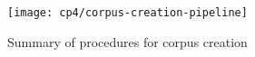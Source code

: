 \begin{figure}
    \centering
    \texttt{[image: cp4/corpus-creation-pipeline]}
    \caption{Summary of procedures for corpus creation}
    \label{fig:corpus-creation-pipeline}
\end{figure}













